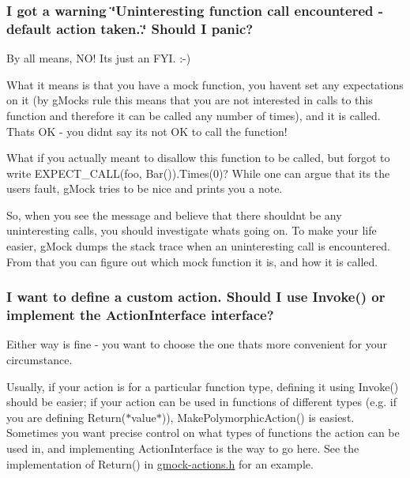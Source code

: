 \subsubsection*{I got a warning \char`\"{}\+Uninteresting function call encountered -\/ default action taken..\char`\"{} Should I panic?}

By all means, N\+O! It\textquotesingle{}s just an F\+YI. \+:-\/)

What it means is that you have a mock function, you haven\textquotesingle{}t set any expectations on it (by g\+Mock\textquotesingle{}s rule this means that you are not interested in calls to this function and therefore it can be called any number of times), and it is called. That\textquotesingle{}s OK -\/ you didn\textquotesingle{}t say it\textquotesingle{}s not OK to call the function!

What if you actually meant to disallow this function to be called, but forgot to write {\ttfamily E\+X\+P\+E\+C\+T\+\_\+\+C\+A\+L\+L(foo, Bar()).Times(0)}? While one can argue that it\textquotesingle{}s the user\textquotesingle{}s fault, g\+Mock tries to be nice and prints you a note.

So, when you see the message and believe that there shouldn\textquotesingle{}t be any uninteresting calls, you should investigate what\textquotesingle{}s going on. To make your life easier, g\+Mock dumps the stack trace when an uninteresting call is encountered. From that you can figure out which mock function it is, and how it is called.

\subsubsection*{I want to define a custom action. Should I use Invoke() or implement the Action\+Interface interface?}

Either way is fine -\/ you want to choose the one that\textquotesingle{}s more convenient for your circumstance.

Usually, if your action is for a particular function type, defining it using {\ttfamily Invoke()} should be easier; if your action can be used in functions of different types (e.\+g. if you are defining {\ttfamily Return($\ast$value$\ast$)}), {\ttfamily Make\+Polymorphic\+Action()} is easiest. Sometimes you want precise control on what types of functions the action can be used in, and implementing {\ttfamily Action\+Interface} is the way to go here. See the implementation of {\ttfamily Return()} in {\ttfamily \mbox{\hyperlink{gmock-actions_8h_source}{gmock-\/actions.\+h}}} for an example.

